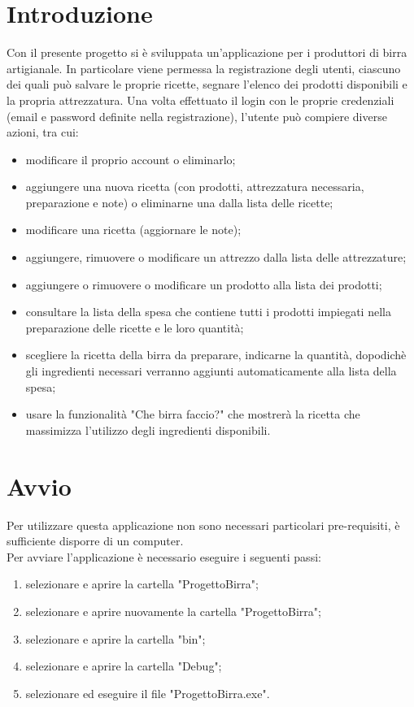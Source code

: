 \documentclass[a4paper, titlepage]{article}
\begin{document}
\section{Introduzione}
Con il presente progetto si è sviluppata un’applicazione per i produttori di birra artigianale. In particolare viene permessa la registrazione degli utenti, ciascuno dei quali può salvare le proprie ricette, segnare l’elenco dei prodotti disponibili e la propria attrezzatura. Una volta effettuato il login con le proprie credenziali (email e password definite nella registrazione), l’utente può compiere diverse azioni, tra cui:
\begin{itemize}
    \item modificare il proprio account o eliminarlo;
    \item aggiungere una nuova ricetta (con prodotti, attrezzatura necessaria, preparazione e note) o eliminarne una dalla lista delle ricette;
    \item modificare una ricetta (aggiornare le note);
    \item aggiungere, rimuovere o modificare un attrezzo dalla lista delle attrezzature;
    \item aggiungere o rimuovere o modificare un prodotto alla lista dei prodotti;
    \item consultare la lista della spesa che contiene tutti i prodotti impiegati nella preparazione delle ricette e le loro quantità;
    \item scegliere la ricetta della birra da preparare, indicarne la quantità, dopodichè gli ingredienti necessari verranno aggiunti automaticamente alla lista della spesa;
    \item usare la funzionalità "Che birra faccio?" che mostrerà la ricetta che massimizza l'utilizzo degli ingredienti disponibili.
\end{itemize}


\newpage

\section{Avvio}
Per utilizzare questa applicazione non sono necessari particolari pre-requisiti, è sufficiente disporre di un computer.\\
Per avviare l'applicazione è necessario eseguire i seguenti passi:
\begin{enumerate}
    \item selezionare e aprire la cartella "ProgettoBirra";
    \item selezionare e aprire nuovamente la cartella "ProgettoBirra";
    \item selezionare e aprire la cartella "bin";
    \item selezionare e aprire la cartella "Debug";
    \item selezionare ed eseguire il file "ProgettoBirra.exe".\\
\end{enumerate}
\end{document}
